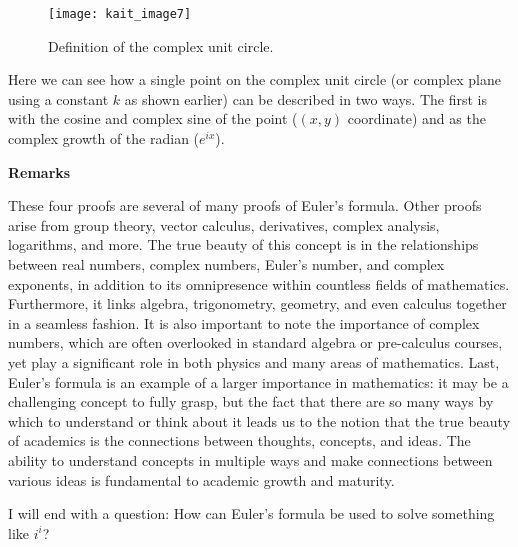 \renewcommand{\thefigure}{7}
\begin{figure}[h]
  \begin{center}
    \texttt{[image: kait\_image7]}
  \end{center}
  \caption{Definition of the complex unit circle.}
  \label{fig:7}
\end{figure}

Here we can see how a single point on the complex unit circle (or complex plane using a constant $k$ as shown earlier) can be described in two ways. The first is with the cosine and complex sine of the point ($(x,y)$ coordinate) and as the complex growth of the radian ($e^{ix}$).

\noindent
\textbf{Remarks}

These four proofs are several of many proofs of Euler’s formula. Other proofs arise from group theory, vector calculus, derivatives, complex analysis, logarithms, and more. The true beauty of this concept is in the relationships between real numbers, complex numbers, Euler’s number, and complex exponents, in addition to its omnipresence within countless fields of mathematics. Furthermore, it links algebra, trigonometry, geometry, and even calculus together in a seamless fashion. It is also important to note the importance of complex numbers, which are often overlooked in standard algebra or pre-calculus courses, yet play a significant role in both physics and many areas of mathematics. Last, Euler’s formula is an example of a larger importance in mathematics: it may be a challenging concept to fully grasp, but the fact that there are so many ways by which to understand or think about it leads us to the notion that the true beauty of academics is the connections between thoughts, concepts, and ideas. The ability to understand concepts in multiple ways and make connections between various ideas is fundamental to academic growth and maturity. 

I will end with a question: How can Euler’s formula be used to solve something like $i^i$?